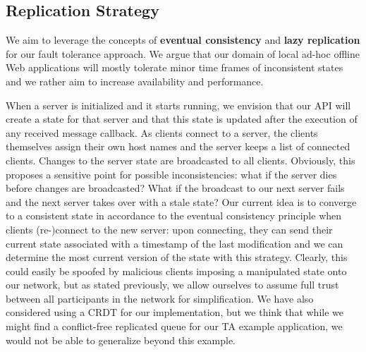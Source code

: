 \subsection{Replication Strategy}

We aim to leverage the concepts of \textbf{eventual consistency} and \textbf{lazy replication} for our fault tolerance approach. We argue that our domain of local ad-hoc offline Web applications will mostly tolerate minor time frames of inconsistent states and we rather aim to increase availability and performance.

When a server is initialized and it starts running, we envision that our API will create a state for that server and that this state is updated after the execution of any received message callback. As clients connect to a server, the clients themselves assign their own host names and the server keeps a list of connected clients. Changes to the server state are broadcasted to all clients. Obviously, this proposes a sensitive point for possible inconsistencies: what if the server dies before changes are broadcasted? What if the broadcast to our next server fails and the next server takes over with a stale state? Our current idea is to converge to a consistent state in accordance to the eventual consistency principle when clients (re-)connect to the new server: upon connecting, they can send their current state associated with a timestamp of the last modification and we can determine the most current version of the state with this strategy. Clearly, this could easily be spoofed by malicious clients imposing a manipulated state onto our network, but as stated previously, we allow ourselves to assume full trust between all participants in the network for simplification. We have also considered using a CRDT for our implementation, but we think that while we might find a conflict-free replicated queue for our TA example application, we would not be able to generalize beyond this example.
